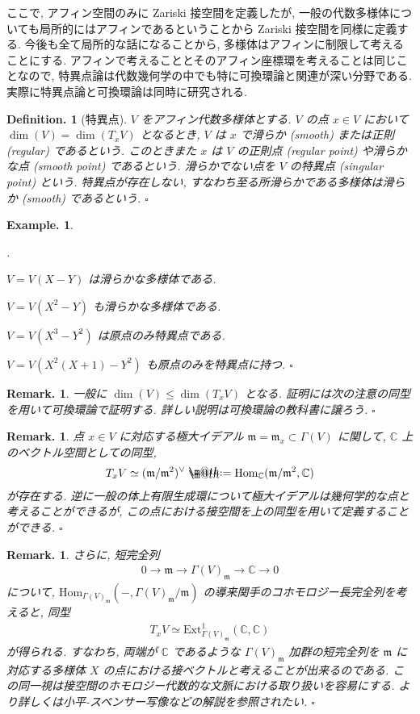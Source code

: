 \documentclass[openany, a4paper, oneside]{jsbook}
\makeatletter
\newcounter{enum2}
\renewenvironment{enumerate}{%
\begin{list}%
{%
\arabic{enum2}.\ \,%
}%
{%
\usecounter{enum2}
\setlength{\itemindent}{0pt}%
\setlength{\leftmargin}{15pt}%
\setlength{\rightmargin}{0pt}%
\setlength{\labelsep}{0pt}%
\setlength{\labelwidth}{6pt}%
\setlength{\itemsep}{0pt}%
\setlength{\parsep}{0pt}%
\setlength{\listparindent}{0pt}%
}
}{%
\end{list}%
}
\newcommand*{\defeq}{\mathrel{\rlap{%
\raisebox{0.3ex}{$\m@th\cdot$}}%
\raisebox{-0.3ex}{$\m@th\cdot$}}%
=}
\theoremstyle{break}
\theoremstyle{breakdefn}
\newtheorem{defn}[thm]{Definition.}
\newtheorem{ex}[thm]{Example.}
\newtheorem{rem}[thm]{Remark.}
\newcommand{\fin}{\hfill $\square$ \par}
\newcommand{\homo}{\mathrm{Hom}}
\newcommand{\map}{\longrightarrow}
\makeatother
\begin{document}
ここで, アフィン空間のみに Zariski 接空間を定義したが,
一般の代数多様体についても局所的にはアフィンであるということから Zariski 接空間を同様に定義する.
今後も全て局所的な話になることから, 多様体はアフィンに制限して考えることにする.
アフィンで考えることとそのアフィン座標環を考えることは同じことなので,
特異点論は代数幾何学の中でも特に可換環論と関連が深い分野である.
実際に特異点論と可換環論は同時に研究される.
\begin{defn}[特異点]
$V$ をアフィン代数多様体とする.
$V$ の点 $x \in V$ において $\dim (V)=\dim (T_xV)$ となるとき,
$V$ は $x$ で滑らか (smooth) または正則 (regular) であるという.
このときまた $x$ は $V$ の正則点 (regular point) や滑らかな点 (smooth point) であるという.
滑らかでない点を $V$ の特異点 (singular point) という.
特異点が存在しない, すなわち至る所滑らかである多様体は滑らか (smooth) であるという. \fin
\end{defn}
\begin{ex}
\begin{enumerate}
\item $V=V (X-Y)$ は滑らかな多様体である.
\item $V=V (X^2-Y)$ も滑らかな多様体である.
\item $V=V (X^3-Y^2)$ は原点のみ特異点である.
\item $V=V (X^2 (X+1)-Y^2)$ も原点のみを特異点に持つ. \fin
\end{enumerate}
\end{ex}
\begin{rem}
一般に $\dim (V) \leq \dim (T_x V)$ となる.
証明には次の注意の同型を用いて可換環論で証明する.
詳しい説明は可換環論の教科書に譲ろう. \fin
\end{rem}
\begin{rem}
点 $x \in V$ に対応する極大イデアル $\mathfrak{m} = \mathfrak{m}_x \subset \Gamma (V)$ に関して,
$\mathbb{C}$ 上のベクトル空間としての同型,
\begin{align}
 T_x V
 \simeq
 (\mathfrak{m}/\mathfrak{m}^2)^{\vee}
 \defeq
 \homo_{\mathbb{C}}(\mathfrak{m} / \mathfrak{m}^2, \mathbb{C})
\end{align}
が存在する.
逆に一般の体上有限生成環について極大イデアルは幾何学的な点と考えることができるが,
この点における接空間を上の同型を用いて定義することができる. \fin
\end{rem}
\begin{rem}
さらに, 短完全列
\begin{align}
 0 \map \mathfrak{m} \map \Gamma (V)_{\mathfrak{m}} \map \mathbb{C} \map 0
\end{align}
について, $\homo_{\Gamma (V)_{\mathfrak{m}}}(-, \Gamma (V)_{\mathfrak{m}}/\mathfrak{m})$ の導来関手のコホモロジー長完全列を考えると,
同型
\begin{align}
 T_xV
 \simeq
 \mathrm{Ext}_{\Gamma (V)_{\mathfrak{m}}}^1 (\mathbb{C},\mathbb{C})
\end{align}
が得られる.
すなわち, 両端が $\mathbb{C}$ であるような $\Gamma (V)_{\mathfrak{m}}$ 加群の短完全列を
$\mathfrak{m}$ に対応する多様体 $X$ の点における接ベクトルと考えることが出来るのである.
この同一視は接空間のホモロジー代数的な文脈における取り扱いを容易にする.
より詳しくは小平-スペンサー写像などの解説を参照されたい. \fin
\end{rem}
\end{document}
